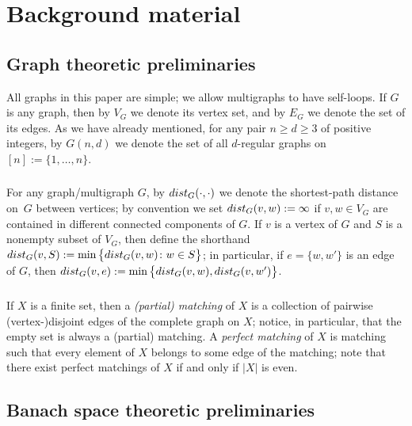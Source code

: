 \documentclass[11pt,leqno]{amsart}
\theoremstyle{remark}
\theoremstyle{plain}
\def\dist{{\rm dist}}
\def\dist{{\rm dist}}
\begin{document}
\section{Background material} \label{sec2}

\subsection{Graph theoretic preliminaries}

All graphs in this paper are simple; we allow multigraphs to have self-loops. If $G$ is any graph, then by $V_G$ we denote
its vertex set, and by $E_G$ we denote the set of its edges. As we have already mentioned, for any pair
$n\geqslant d\geqslant 3$ of positive integers, by $G(n,d)$ we denote the set of all $d$-regular graphs on $[n]:=\{1,\dots,n\}$.

\subsubsection{\!}

For any graph/multigraph $G$, by $\dist_G(\cdot,\cdot)$ we denote the shortest-path distance on~$G$ between vertices;
by convention we set $\dist_G(v,w):=\infty$ if $v,w\in V_G$ are contained in different connected components of $G$.
If $v$ is a vertex of $G$ and $S$ is a nonempty subset of $V_G$, then define the shorthand
$\dist_G(v,S):= \min\big\{ \dist_G(v,w)\colon w\in S\big\}$; in particular, if $e = \{w,w'\}$ is an edge of $G$, then
$\dist_G(v,e):=\min\big\{ \dist_G(v,w),\dist_G(v,w')\big\}$.

\subsubsection{\!}

If $X$ is a finite set, then a \emph{(partial) matching} of $X$ is a collection of pairwise (vertex-)disjoint edges of the
complete graph on $X$; notice, in particular, that the empty set is always a (partial) matching. A \emph{perfect matching}
of $X$ is matching such that every element of $X$ belongs to some edge of the matching; note that there exist
perfect matchings of $X$ if and only if $|X|$ is even.

\subsection{Banach space theoretic preliminaries}
\end{document}
